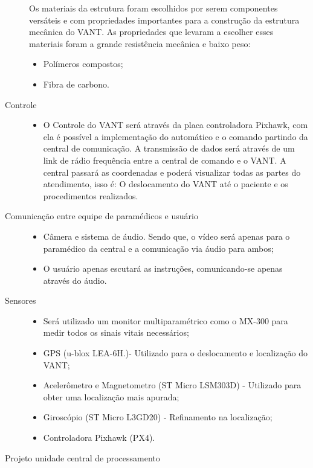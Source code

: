 \begin{description}
  Os materiais da estrutura foram escolhidos por serem componentes versáteis e com propriedades importantes para a construção da estrutura mecânica do VANT. As propriedades que levaram a escolher esses materiais foram a grande resistência mecânica e baixo peso:
  	\begin{itemize}
  		\item Polímeros compostos;
		\item Fibra de carbono.
  	\end{itemize}
  \item[Controle] \hfill 
  	\begin{itemize}
  		\item O Controle do VANT será através da placa controladora Pixhawk, com ela é possível a implementação do automático e o comando partindo da central de comunicação. A transmissão de dados será através de um link de rádio frequência entre a central de comando e o VANT. A central passará as coordenadas e poderá visualizar todas as partes do atendimento, isso é: 
O deslocamento do VANT até o paciente e os procedimentos realizados. 
  	\end{itemize}
  \item[Comunicação entre equipe de paramédicos e usuário] \hfill 
  	\begin{itemize}
  		\item Câmera e sistema de áudio. Sendo que, o vídeo será apenas para o paramédico da central e a comunicação via áudio para ambos;
  		\item O usuário apenas escutará as instruções, comunicando-se apenas através do áudio.
  	\end{itemize}
  \item[Sensores] \hfill 
  	\begin{itemize}
  		\item Será utilizado um monitor multiparamétrico como o MX-300 para medir todos os sinais vitais necessários;
		\item GPS (u-blox LEA-6H.)- Utilizado para o deslocamento e localização do VANT;
		\item Acelerômetro e Magnetometro (ST Micro LSM303D) - Utilizado para obter uma localização mais apurada;
		\item Giroscópio (ST Micro L3GD20) - Refinamento na localização;
		\item Controladora Pixhawk (PX4).
  	\end{itemize}
  \item[Projeto unidade central de processamento] \hfill 
  	\begin{itemize}

\end{itemize}
\end{description}
